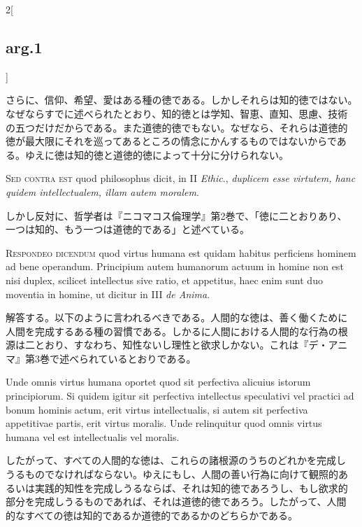 \documentclass[paper=a4paper,fontsize=10pt,jafontsize=9pt,titlepage]{jlreq}
\begin{document}
\begin{paracol}{2}[\subsection{arg.1}]
\switchcolumn

さらに、信仰、希望、愛はある種の徳である。しかしそれらは知的徳ではない。
なぜならすでに述べられたとおり、知的徳とは学知、智恵、直知、思慮、技術
の五つだけだからである。また道徳的徳でもない。なぜなら、それらは道徳的
徳が最大限にそれを巡ってあるところの情念にかんするものではないからであ
る。ゆえに徳は知的徳と道徳的徳によって十分に分けられない。

\switchcolumn*[\subsection{s.c.}]

{\scshape Sed contra est} quod philosophus dicit, in II {\itshape
Ethic}., {\itshape duplicem esse virtutem, hanc quidem intellectualem,
illam autem moralem}.

\switchcolumn

しかし反対に、哲学者は『ニコマコス倫理学』第2巻で、「徳に二とおりあり、
一つは知的、もう一つは道徳的である」と述べている。


{\scshape Respondeo dicendum} quod virtus humana est quidam habitus
perficiens hominem ad bene operandum. Principium autem humanorum
actuum in homine non est nisi duplex, scilicet intellectus sive ratio,
et appetitus, haec enim sunt duo moventia in homine, ut dicitur in III
{\itshape de Anima}.

\switchcolumn

解答する。以下のように言われるべきである。人間的な徳は、善く働くために
人間を完成するある種の習慣である。しかるに人間における人間的な行為の根
源は二とおり、すなわち、知性ないし理性と欲求しかない。これは『デ・アニ
マ』第3巻で述べられているとおりである。

\switchcolumn*

Unde omnis virtus humana oportet quod sit
perfectiva alicuius istorum principiorum. Si quidem igitur sit
perfectiva intellectus speculativi vel practici ad bonum hominis
actum, erit virtus intellectualis, si autem sit perfectiva appetitivae
partis, erit virtus moralis. Unde relinquitur quod omnis virtus humana
vel est intellectualis vel moralis.

\switchcolumn

したがって、すべての人間的な徳は、これらの諸根源のうちのどれかを完成し
うるものでなければならない。ゆえにもし、人間の善い行為に向けて観照的あ
るいは実践的知性を完成しうるならば、それは知的徳であろうし、もし欲求的
部分を完成しうるものであれば、それは道徳的徳であろう。したがって、人間
的なすべての徳は知的であるか道徳的であるかのどちらかである。


\end{paracol}
\end{document}
